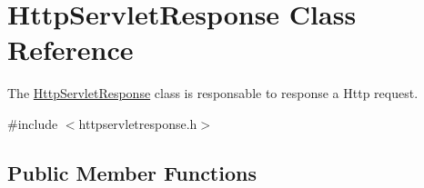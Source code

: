 \hypertarget{class_http_servlet_response}{}\section{Http\+Servlet\+Response Class Reference}
\label{class_http_servlet_response}


The \hyperlink{class_http_servlet_response}{Http\+Servlet\+Response} class is responsable to response a Http request.  




{\ttfamily \#include $<$httpservletresponse.\+h$>$}

\subsection*{Public Member Functions}
